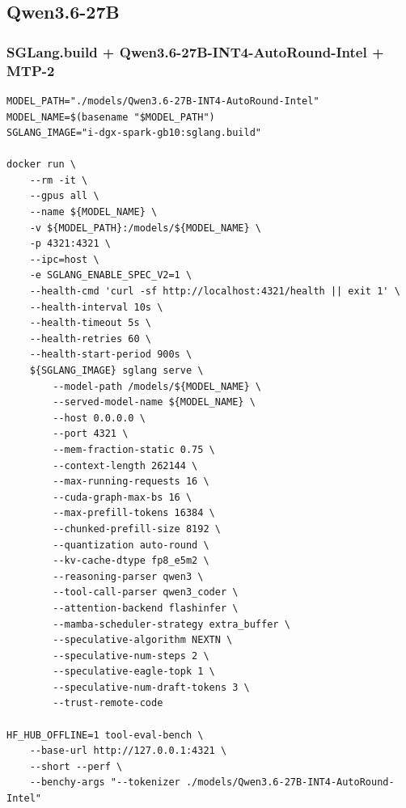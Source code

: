 \documentclass{article}
\begin{document}
\subsection{Qwen3.6-27B}
\subsubsection{SGLang.build + Qwen3.6-27B-INT4-AutoRound-Intel + MTP-2}
\begin{lstlisting}
MODEL_PATH="./models/Qwen3.6-27B-INT4-AutoRound-Intel"
MODEL_NAME=$(basename "$MODEL_PATH")
SGLANG_IMAGE="i-dgx-spark-gb10:sglang.build"

docker run \
    --rm -it \
    --gpus all \
    --name ${MODEL_NAME} \
    -v ${MODEL_PATH}:/models/${MODEL_NAME} \
    -p 4321:4321 \
    --ipc=host \
    -e SGLANG_ENABLE_SPEC_V2=1 \
    --health-cmd 'curl -sf http://localhost:4321/health || exit 1' \
    --health-interval 10s \
    --health-timeout 5s \
    --health-retries 60 \
    --health-start-period 900s \
    ${SGLANG_IMAGE} sglang serve \
        --model-path /models/${MODEL_NAME} \
        --served-model-name ${MODEL_NAME} \
        --host 0.0.0.0 \
        --port 4321 \
        --mem-fraction-static 0.75 \
        --context-length 262144 \
        --max-running-requests 16 \
        --cuda-graph-max-bs 16 \
        --max-prefill-tokens 16384 \
        --chunked-prefill-size 8192 \
        --quantization auto-round \
        --kv-cache-dtype fp8_e5m2 \
        --reasoning-parser qwen3 \
        --tool-call-parser qwen3_coder \
        --attention-backend flashinfer \
        --mamba-scheduler-strategy extra_buffer \
        --speculative-algorithm NEXTN \
        --speculative-num-steps 2 \
        --speculative-eagle-topk 1 \
        --speculative-num-draft-tokens 3 \
        --trust-remote-code

HF_HUB_OFFLINE=1 tool-eval-bench \
    --base-url http://127.0.0.1:4321 \
    --short --perf \
    --benchy-args "--tokenizer ./models/Qwen3.6-27B-INT4-AutoRound-Intel"
\end{lstlisting}
\end{document}

